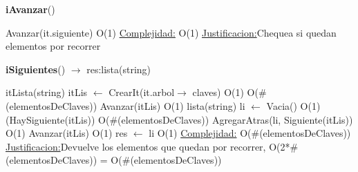 \begin{Algoritmos}
\begin{algorithm}[H]{\textbf{iAvanzar}()}
	\begin{algorithmic}[1]
		\State Avanzar(it.siguiente) \Comment O(1)
		\medskip
		\Statex \underline{Complejidad:} O(1)
			\Statex \underline{Justificacion:}Chequea si quedan elementos por recorrer
	\end{algorithmic}
\end{algorithm}

\begin{algorithm}[H]{\textbf{iSiguientes}() $\to$ res:lista(string)}
	\begin{algorithmic}[1]
		\State itLista(string) itLis $\gets$ CrearIt(it.arbol$\to$ claves) \Comment O(1)
		 \Comment O($\#$(elementosDeClaves))
			\State Avanzar(itLis) \Comment O(1)
		\EndWhile
		\State lista(string) li $\gets$ Vacia() \Comment O(1)
		\While(HaySiguiente(itLis)) \Comment O($\#$(elementosDeClaves))
			\State AgregarAtras(li, Siguiente(itLis)) \Comment O(1)
			\State Avanzar(itLis) \Comment O(1) 		
		\EndWhile
		\State res $\gets$ li \Comment O(1)
		\medskip
		\Statex \underline{Complejidad:} O($\#$(elementosDeClaves))
			\Statex \underline{Justificacion:}Devuelve los elementos que quedan por recorrer, O(2*$\#$(elementosDeClaves)) = O($\#$(elementosDeClaves))
	\end{algorithmic}
\end{algorithm}

\end{Algoritmos}

